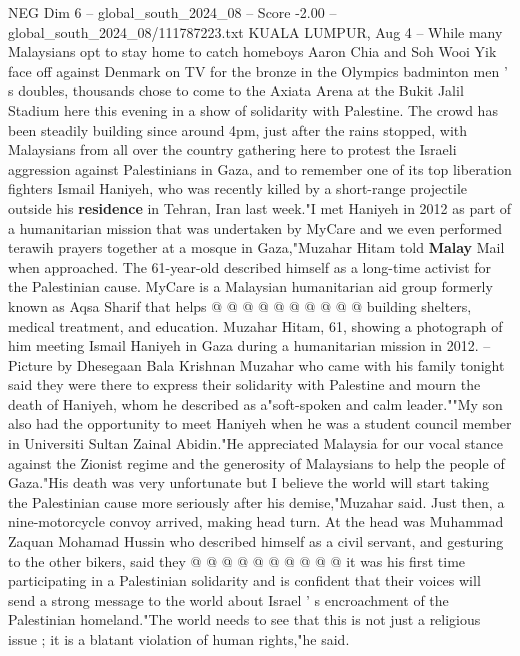 \begin{textsample}{NEG Dim 6 – global\_south\_2024\_08 – Score -2.00 – global\_south\_2024\_08/111787223.txt}  \label{ex:f6_neg_127}
KUALA LUMPUR, Aug 4 -- While many Malaysians opt to stay home to catch homeboys Aaron Chia and Soh Wooi Yik face off against Denmark on TV for the bronze in the Olympics badminton men ' s doubles, thousands chose to come to the Axiata Arena at the Bukit Jalil Stadium here this evening in a show of solidarity with Palestine.
The crowd has been steadily building since around 4pm, just after the rains stopped, with Malaysians from all over the country gathering here to protest the Israeli aggression against Palestinians in Gaza, and to remember one of its top liberation fighters Ismail Haniyeh, who was recently killed by a short-range projectile outside his \textbf{residence} in Tehran, Iran last week."I met Haniyeh in 2012 as part of a humanitarian mission that was undertaken by MyCare and we even performed terawih prayers together at a mosque in Gaza,"Muzahar Hitam told \textbf{Malay} Mail when approached.
The 61-year-old described himself as a long-time activist for the Palestinian cause.
MyCare is a Malaysian humanitarian aid group formerly known as Aqsa Sharif that helps @ @ @ @ @ @ @ @ @ @ building shelters, medical treatment, and education.
Muzahar Hitam, 61, showing a photograph of him meeting Ismail Haniyeh in Gaza during a humanitarian mission in 2012. -- Picture by Dhesegaan Bala Krishnan Muzahar who came with his family tonight said they were there to express their solidarity with Palestine and mourn the death of Haniyeh, whom he described as a"soft-spoken and calm leader.""My son also had the opportunity to meet Haniyeh when he was a student council member in Universiti Sultan Zainal Abidin."He appreciated Malaysia for our vocal stance against the Zionist regime and the generosity of Malaysians to help the people of Gaza."His death was very unfortunate but I believe the world will start taking the Palestinian cause more seriously after his demise,"Muzahar said.
Just then, a nine-motorcycle convoy arrived, making head turn.
At the head was Muhammad Zaquan Mohamad Hussin who described himself as a civil servant, and gesturing to the other bikers, said they @ @ @ @ @ @ @ @ @ @ it was his first time participating in a Palestinian solidarity and is confident that their voices will send a strong message to the world about Israel ' s encroachment of the Palestinian homeland."The world needs to see that this is not just a religious issue ; it is a blatant violation of human rights,"he said.

\end{textsample}
